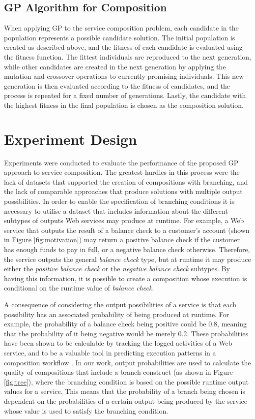 \documentclass[conference]{IEEEtran}
\begin{document}
\subsection{GP Algorithm for Composition}
When applying GP to the service composition problem, each candidate in the population represents a possible candidate solution. The initial population is created as described above, and the fitness of each candidate is evaluated using the fitness function. The fittest individuals are reproduced to the next generation, while other candidates are created in the next generation by applying the mutation and crossover operations to currently promising individuals. This new generation is then evaluated according to the fitness of candidates, and the process is repeated for a fixed number of generations. Lastly, the candidate with the highest fitness in the final population is chosen as the composition solution.

\section{Experiment Design}\label{experiments}

Experiments were conducted to evaluate the performance of the proposed GP approach to service composition. The greatest hurdles in this process were the lack of datasets that supported the creation of compositions with branching, and the lack of comparable approaches that produce solutions with multiple output possibilities. In order to enable the specification of branching conditions it is necessary to utilise a dataset that includes information about the different subtypes of outputs Web services may produce at runtime. For example, a Web service that outputs the result of a balance check to a customer's account (shown in Figure \ref{fig:motivation}) may return a positive balance check if the customer has enough funds to pay in full, or a negative balance check otherwise. Therefore, the service outputs the general \textit{balance check} type, but at runtime it may produce either the \textit{positive balance check} or the \textit{negative balance check} subtypes. By having this information, it is possible to create a composition whose execution is conditional on the runtime value of \textit{balance check}.

A consequence of considering the output possibilities of a service is that each possibility has an associated probability of being produced at runtime. For example, the probability of a balance check being positive could be 0.8, meaning that the probability of it being negative would be merely 0.2. These probabilities have been shown to be calculable by tracking the logged activities of a Web service, and to be a valuable tool in predicting execution patterns in a composition workflow \cite{clarke2014modelling}. In our work, output probabilities are used to calculate the quality of compositions that include a branch construct (as shown in Figure \ref{fig:tree}), where the branching condition is based on the possible runtime output values for a service. This means that the probability of a branch being chosen is dependent on the probabilities of a certain output being produced by the service whose value is used to satisfy the branching condition.
\end{document}
